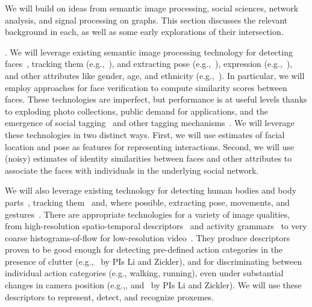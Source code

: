 \label{sec:background}

We will build on ideas from semantic image processing, social sciences, network analysis, and signal processing on graphs. This section discusses the relevant background in each, as well as some early explorations of their intersection.

. We will leverage existing semantic image processing technology for detecting faces~\cite{ViolaJones,Zhang:detect}, tracking them (e.g.,~\cite{Comaniciu:track}), and extracting pose (e.g.,~\cite{Hanson,Murphy-Chutorian:pose}), expression (e.g.,~\cite{Matthews:AAM,delaTorre:expression,Essa:expression}), and other attributes like gender, age, and ethnicity (e.g.,~\cite{LNCS53050340, Gender, Age}).  In particular, we will employ approaches for face verification \cite{ChopraVerification,Kumar09attributeand,DeepFace} to compute similarity scores between faces. These technologies are imperfect, but performance is at useful levels thanks to exploding photo collections, public demand for applications, and the emergence of social tagging~\cite{Stone2008,Stone2010} and other tagging mechanisms~\cite{berg2004naf,berg2005sp,Everingham06a,huang:lfw,YangBKR12}. We will leverage these technologies in two distinct ways. First, we will use estimates of facial location and pose as features for representing interactions. Second, we will use (noisy) estimates of identity similarities between faces and other attributes to associate the faces with individuals in the underlying social network. 

We will also leverage existing technology for detecting human bodies and body parts~\cite{Dalal:HOG,poselet,pose_part}, tracking them~\cite{RamananFZ07,EshelM10} and, where possible, extracting pose, movements, and gestures~\cite{Mitra:gesture,Ryoo:action,Poppe}. There are appropriate technologies for a variety of image qualities, from high-resolution spatio-temporal descriptors~\cite{Dollar:STIP,Laptev:STIP,Brox:flow} and activity grammars~\cite{Niebles2007,Niebles2006} to very coarse histograms-of-flow for low-resolution video~\cite{EfrosBMM03}. They produce descriptors proven to be good enough for detecting pre-defined action categories in the presence of clutter (e.g.,~\cite{groupdet2013, Li2010} by PIs Li and Zickler), and for discriminating between individual action categories (e.g., walking, running), even under substantial changes in camera position (e.g.,\cite{Weinland:invariance2}, and~\cite{LiZickler2012} by PIs Li and Zickler). We will use these descriptors to represent, detect, and recognize proxemes.

